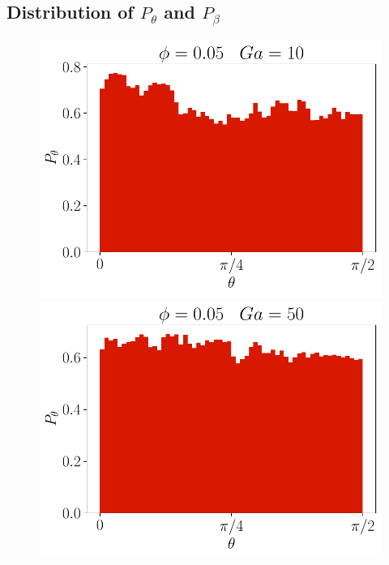 \subsection*{Distribution of $P_{\theta}$ and $P_{\beta}$}
\label{sec:dist_theta}
\begin{figure}[h!]
    \centering
    \includegraphics[height =\size]{image/N_10/beta/2DMAP_theta_dmin_10_Bo1PHI0_05mu_r0_042Ga10.pdf}
    \includegraphics[height =\size]{image/N_10/beta/2DMAP_theta_dmin_10_Bo1PHI0_05mu_r0_042Ga50.pdf}

\end{figure}
